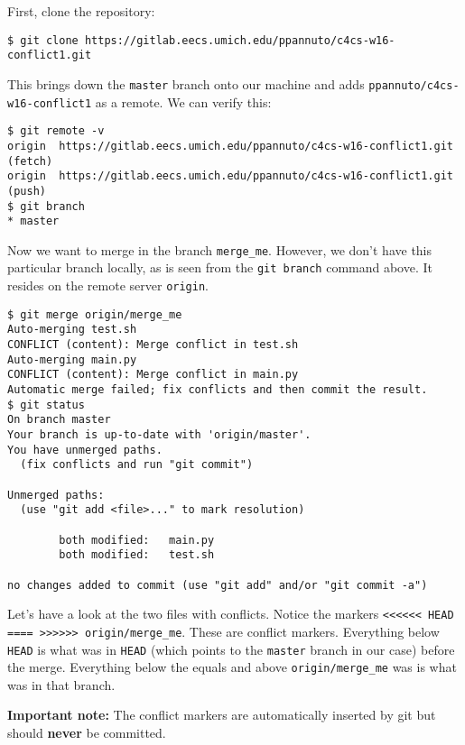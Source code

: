 \documentclass{article}
\begin{document}
{\color{violet}
    First, clone the repository:
    \begin{verbatim}
$ git clone https://gitlab.eecs.umich.edu/ppannuto/c4cs-w16-conflict1.git
    \end{verbatim}

    This brings down the \texttt{master} branch onto our machine and adds
    \texttt{ppannuto/c4cs-w16-conflict1} as a remote. We can verify this:

    \begin{verbatim}
$ git remote -v
origin  https://gitlab.eecs.umich.edu/ppannuto/c4cs-w16-conflict1.git (fetch)
origin  https://gitlab.eecs.umich.edu/ppannuto/c4cs-w16-conflict1.git (push)
$ git branch
* master
    \end{verbatim}

    Now we want to merge in the branch \texttt{merge\_me}. However, we don't
    have this particular branch locally, as is seen from the \texttt{git branch}
    command above. It resides on the remote server \texttt{origin}.

    \begin{verbatim}
$ git merge origin/merge_me
Auto-merging test.sh
CONFLICT (content): Merge conflict in test.sh
Auto-merging main.py
CONFLICT (content): Merge conflict in main.py
Automatic merge failed; fix conflicts and then commit the result.
$ git status
On branch master
Your branch is up-to-date with 'origin/master'.
You have unmerged paths.
  (fix conflicts and run "git commit")

Unmerged paths:
  (use "git add <file>..." to mark resolution)

        both modified:   main.py
        both modified:   test.sh

no changes added to commit (use "git add" and/or "git commit -a")
    \end{verbatim}

    \newpage

    Let's have a look at the two files with conflicts. Notice the markers
    \texttt{<<<<<< HEAD ==== >>>>>> origin/merge\_me}. These are conflict
    markers. Everything below \texttt{HEAD} is what was in \texttt{HEAD} (which
    points to the \texttt{master} branch in our case) before the merge.
    Everything below the equals and above \texttt{origin/merge\_me} was is what
    was in that branch.
    
    \textbf{Important note:} The conflict markers are automatically inserted by
    git but should \textbf{never} be committed.

}
\end{document}
